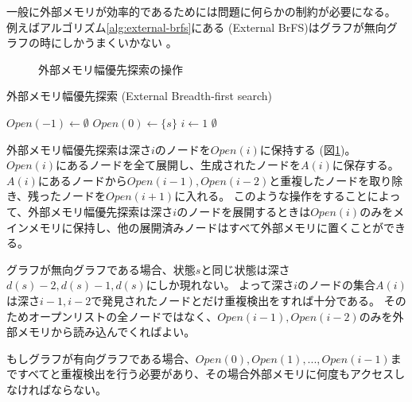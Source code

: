 一般に外部メモリが効率的であるためには問題に何らかの制約が必要になる。
例えばアルゴリズム\ref{alg:external-brfs}にある (External BrFS)はグラフが無向グラフの時にしかうまくいかない \cite{mehlhorn2002external}。

\begin{figure}
  \centering
  \scalebox{0.75}{
  \begin{tikzpicture}[scale=0.6]
    
  \end{tikzpicture}
  }
  \caption{外部メモリ幅優先探索の操作}
  \label{fig:external-brfs}
\end{figure}

\begin{algorithm}
\caption{外部メモリ幅優先探索 (External Breadth-first search)}
\label{alg:external-brfs}
	$Open(-1) \leftarrow \emptyset$\;
	$Open(0) \leftarrow \{s\}$\;
	$i \leftarrow 1$\;
	\Return $\emptyset$\;
\end{algorithm}

外部メモリ幅優先探索は深さ$i$のノードを$Open(i)$に保持する (図\ref{fig:external-brfs})。
$Open(i)$にあるノードを全て展開し、生成されたノードを$A(i)$に保存する。
$A(i)$にあるノードから$Open(i-1), Open(i-2)$と重複したノードを取り除き、残ったノードを$Open(i+1)$に入れる。
このような操作をすることによって、外部メモリ幅優先探索は深さ$i$のノードを展開するときは$Open(i)$のみをメインメモリに保持し、他の展開済みノードはすべて外部メモリに置くことができる。

グラフが無向グラフである場合、状態$s$と同じ状態は深さ$d(s)-2, d(s)-1, d(s)$にしか現れない。
よって深さ$i$のノードの集合$A(i)$は深さ$i-1, i-2$で発見されたノードとだけ重複検出をすれば十分である。
そのためオープンリストの全ノードではなく、$Open(i-1), Open(i-2)$のみを外部メモリから読み込んでくればよい。

もしグラフが有向グラフである場合、$Open(0), Open(1), ..., Open(i-1)$まですべてと重複検出を行う必要があり、その場合外部メモリに何度もアクセスしなければならない。


